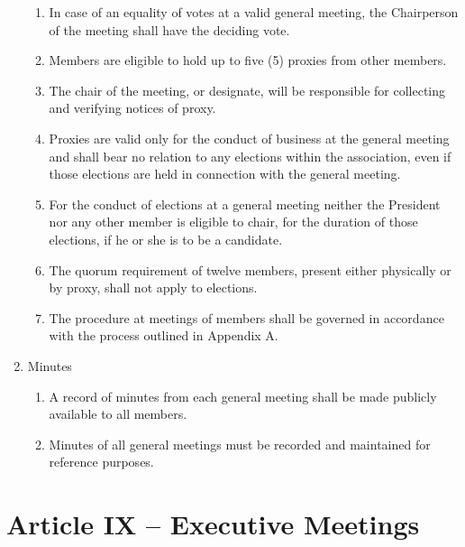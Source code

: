 \documentclass[12pt,a4paper]{article}
\begin{document}
\begin{enumerate}
\begin{enumerate}
\item In case of an equality of votes at a valid general meeting, the Chairperson of the meeting shall have the deciding vote.

\item Members are eligible to hold up to five (5) proxies from other members. 

\item The chair of the meeting, or designate, will be responsible for collecting and verifying notices of proxy.

\item Proxies are valid only for the conduct of business at the general meeting and shall bear no relation to any elections within the association, even if those elections are held in connection with the general meeting.

\item For the conduct of elections at a general meeting neither the President nor any other member is eligible to chair, for the duration of those elections, if he or she is to be a candidate.

\item The quorum requirement of twelve members, present either physically or by proxy, shall not apply to elections.

\item The procedure at meetings of members shall be governed in accordance with the process outlined in
Appendix A.
\end{enumerate}

\item Minutes

\begin{enumerate}
\item A record of minutes from each general meeting shall be made publicly available to all members.

\item Minutes of all general meetings must be recorded and maintained for reference purposes.
\end{enumerate}
\end{enumerate}

\section*{Article IX – Executive Meetings}
\end{document}
